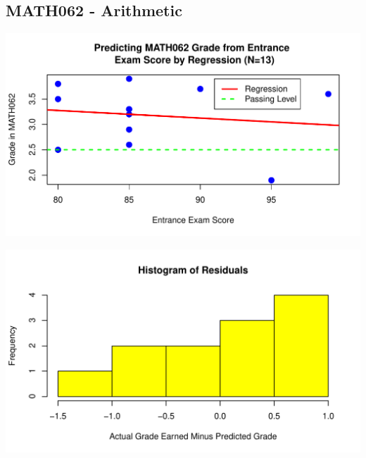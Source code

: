 \documentclass[twoside]{article}\usepackage[]{graphicx}\usepackage[]{color}
\makeatletter
\def\maxwidth{ %
  \ifdim\Gin@nat@width>\linewidth
    \linewidth
  \else
    \Gin@nat@width
  \fi
}
\newenvironment{knitrout}{}{} %
\makeatother
\begin{document}
\newpage
\subsection{MATH062 - Arithmetic}

















\begin{knitrout}
\color{fgcolor}
\includegraphics[width=\maxwidth]{figure/062regressiongraph-1} 

\end{knitrout}




\begin{knitrout}
\color{fgcolor}
\includegraphics[width=\maxwidth]{figure/062residualsplot-1} 

\end{knitrout}
\end{document}
